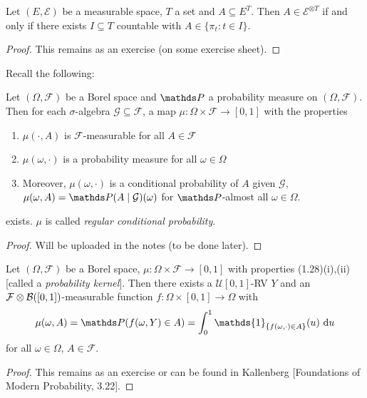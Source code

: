 \begin{lem}
Let $(E,\mathcal{E})$ be a measurable space, $T$ a set and $A \subseteq E^T$. Then $A \in \mathcal{E}^{\otimes T}$ if and only if there exists $I\subseteq T$ countable with $A \in \{\pi_t\colon t\in I\}$.
\begin{proof}
This remains as an exercise (on some exercise sheet).
\end{proof}
\end{lem}
Recall the following:
\begin{thm}
Let $(\Omega,\mathcal{F})$ be a Borel space and $\Prob$ a probability measure on $(\Omega,\mathcal{F})$.
Then for each $\sigma$-algebra $\mathcal{G} \subseteq \mathcal{F}$, a map
$\mu \colon \Omega \times \mathcal{F} \to [0,1]$ with the properties
\begin{enumerate}[label=(\roman*)]
\item $\mu(\cdot,A)$ is $\mathcal{F}$-measurable for all $A \in \mathcal{F}$
\item $\mu(\omega,\cdot)$ is a probability measure for all $\omega \in \Omega$
\item Moreover, $\mu(\omega,\cdot)$ is a conditional probability of $A$ given $\mathcal{G}$, \ie $\mu(\omega,A)=\Prob(A\mid \mathcal{G})(\omega)$ for $\Prob$-almost all $\omega \in \Omega$.
\end{enumerate}
exists. $\mu$ is called \emph{regular conditional probability}.
\begin{proof}
Will be uploaded in the notes (to be done later).
\end{proof}
\end{thm}

\begin{lem}
Let $(\Omega,\mathcal{F})$ be a Borel space, $\mu \colon \Omega \times \mathcal{F} \to [0,1]$ with properties (1.28)(i),(ii) [called a \emph{probability kernel}].
Then there exists a $\mathcal{U}[0,1]$-RV $Y$ and an $\mathcal{F} \otimes \mathcal{B}([0,1])$-measurable function
$f \colon \Omega \times [0,1] \to \Omega$ with
\begin{align*}
\mu(\omega,A)=\Prob(f(\omega,Y)\in A)= \int_0^1 \mathds{1}_{\{f(\omega,\cdot) \in A\}}(u)~\mathrm{d}u
\end{align*}
for all $\omega \in \Omega$, $A \in \mathcal{F}$.
\begin{proof}
This remains as an exercise or can be found in Kallenberg [Foundations of Modern Probability, 3.22].
\end{proof}
\end{lem}

